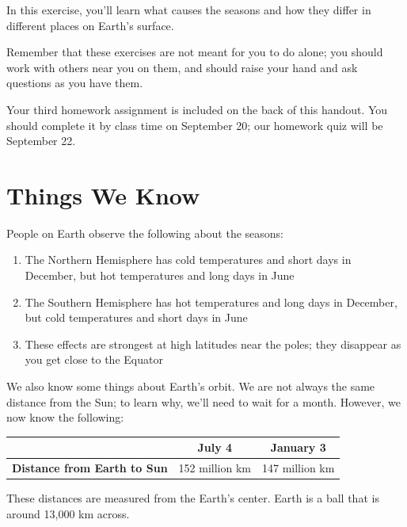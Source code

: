\documentclass[12pt]{article}
\begin{document}
\Large
\centerline{}

\normalsize

In this exercise, you'll learn what causes the seasons and how they differ in different places on Earth's surface.

Remember that these exercises are not meant for you to do alone; you should work with others near you on them, and should raise your hand and ask questions as you have them.

Your third homework assignment is included on the back of this handout. You should complete it by class time on September 20; our homework quiz will be September 22.

\section{Things We Know}

People on Earth observe the following about the seasons:

\begin{enumerate}
	\item The Northern Hemisphere has cold temperatures and short days in December, but hot temperatures and long days in June
	
	\item The Southern Hemisphere has hot temperatures and long days in December, but cold temperatures and short days in June
	
	\item These effects are strongest at high latitudes near the poles; they disappear as you get close to the Equator
\end{enumerate}

We also know some things about Earth's orbit. We are not always the same distance from the Sun; to learn why, we'll need to wait for a month. However, we now know the following:

\begin{center}
\begin{tabular}{|c|c|c|}
	\hline
	\null & \bf{July 4} & \bf{January 3} \\ \hline
	{\bf Distance from Earth to Sun} & 152 million km & 147 million km \\ \hline
\end{tabular}
\end{center}

These distances are measured from the Earth's center. Earth is a ball that is around 13,000 km across.
\end{document}
